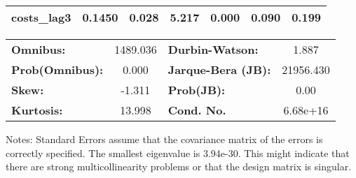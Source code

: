 \begin{center}
\begin{tabular}{lcccccc}
\textbf{costs\_lag3}                   &       0.1450  &        0.028     &     5.217  &         0.000        &        0.090    &        0.199     \\
\bottomrule
\end{tabular}
\begin{tabular}{lclc}
\textbf{Omnibus:}       & 1489.036 & \textbf{  Durbin-Watson:     } &     1.887  \\
\textbf{Prob(Omnibus):} &   0.000  & \textbf{  Jarque-Bera (JB):  } & 21956.430  \\
\textbf{Skew:}          &  -1.311  & \textbf{  Prob(JB):          } &      0.00  \\
\textbf{Kurtosis:}      &  13.998  & \textbf{  Cond. No.          } &  6.68e+16  \\
\bottomrule
\end{tabular}
\end{center}

Notes: \newline
 [1] Standard Errors assume that the covariance matrix of the errors is correctly specified. \newline
 [2] The smallest eigenvalue is 3.94e-30. This might indicate that there are \newline
 strong multicollinearity problems or that the design matrix is singular.